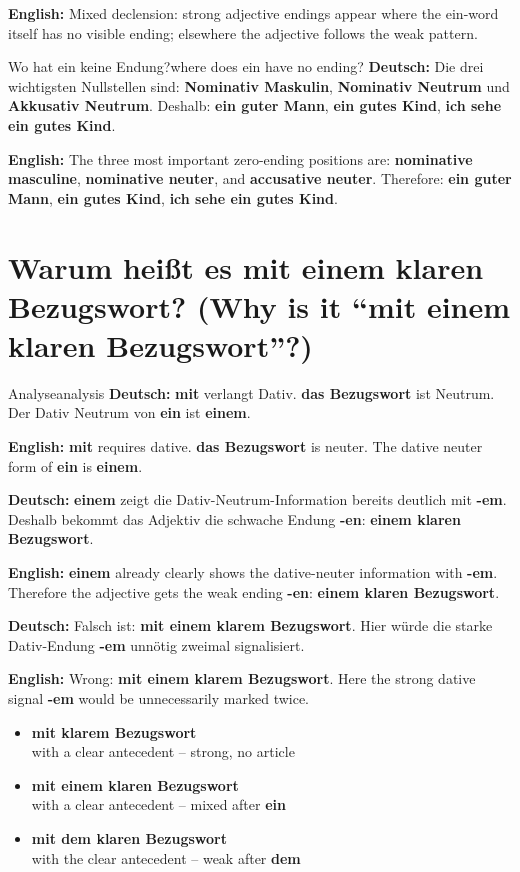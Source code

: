 \documentclass[a4paper,11pt]{article}
\newcommand{\GermanText}[1]{\textbf{Deutsch: }#1\par}
\newcommand{\EnglishText}[1]{{\small\color{SoftGray}\textbf{English: }#1\par}}
\newcommand{\ExampleItem}[2]{\item \textbf{#1}\\{\small\color{SoftGray}#2}}
\newcommand{\TableEnglish}[1]{{\small\color{SoftGray}\textbf{English: }#1\par}}
\begin{document}
\TableEnglish{Mixed declension: strong adjective endings appear where the ein-word itself has no visible ending; elsewhere the adjective follows the weak pattern.}

\begin{grammarentry}{Wo hat ein keine Endung?}{where does ein have no ending?}
\GermanText{Die drei wichtigsten Nullstellen sind: \textbf{Nominativ Maskulin}, \textbf{Nominativ Neutrum} und \textbf{Akkusativ Neutrum}. Deshalb: \textbf{ein guter Mann}, \textbf{ein gutes Kind}, \textbf{ich sehe ein gutes Kind}.}
\EnglishText{The three most important zero-ending positions are: \textbf{nominative masculine}, \textbf{nominative neuter}, and \textbf{accusative neuter}. Therefore: \textbf{ein guter Mann}, \textbf{ein gutes Kind}, \textbf{ich sehe ein gutes Kind}.}
\end{grammarentry}

\section{Warum heißt es \glqq mit einem klaren Bezugswort\grqq? \textnormal{(Why is it ``mit einem klaren Bezugswort''?)}}

\begin{grammarentry}{Analyse}{analysis}
\GermanText{\textbf{mit} verlangt Dativ. \textbf{das Bezugswort} ist Neutrum. Der Dativ Neutrum von \textbf{ein} ist \textbf{einem}.}
\EnglishText{\textbf{mit} requires dative. \textbf{das Bezugswort} is neuter. The dative neuter form of \textbf{ein} is \textbf{einem}.}

\GermanText{\textbf{einem} zeigt die Dativ-Neutrum-Information bereits deutlich mit \textbf{-em}. Deshalb bekommt das Adjektiv die schwache Endung \textbf{-en}: \textbf{einem klaren Bezugswort}.}
\EnglishText{\textbf{einem} already clearly shows the dative-neuter information with \textbf{-em}. Therefore the adjective gets the weak ending \textbf{-en}: \textbf{einem klaren Bezugswort}.}

\GermanText{Falsch ist: \textbf{mit einem klarem Bezugswort}. Hier würde die starke Dativ-Endung \textbf{-em} unnötig zweimal signalisiert.}
\EnglishText{Wrong: \textbf{mit einem klarem Bezugswort}. Here the strong dative signal \textbf{-em} would be unnecessarily marked twice.}
\end{grammarentry}

\begin{exbox}
\begin{itemize}
\ExampleItem{mit klarem Bezugswort}{with a clear antecedent -- strong, no article}
\ExampleItem{mit einem klaren Bezugswort}{with a clear antecedent -- mixed after \textbf{ein}}
\ExampleItem{mit dem klaren Bezugswort}{with the clear antecedent -- weak after \textbf{dem}}
\end{itemize}
\end{exbox}
\end{document}
